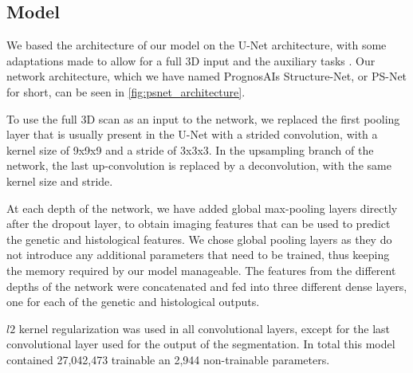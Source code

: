 \subsection{Model}\label{sec:model}

We based the architecture of our model on the U-Net architecture, with some adaptations made to allow for a full 3D input and the auxiliary tasks \autocite{ronneberger2015unet}.
Our network architecture, which we have named PrognosAIs Structure-Net, or PS-Net for short, can be seen in \cref{fig:psnet_architecture}.

To use the full 3D scan as an input to the network, we replaced the first pooling layer that is usually present in the U-Net with a strided convolution, with a kernel size of 9x9x9 and a stride of 3x3x3.
In the upsampling branch of the network, the last up-convolution is replaced by a deconvolution, with the same kernel size and stride.

At each depth of the network, we have added global max-pooling layers directly after the dropout layer, to obtain imaging features that can be used to predict the genetic and histological features.
We chose global pooling layers as they do not introduce any additional parameters that need to be trained, thus keeping the memory required by our model manageable.
The features from the different depths of the network were concatenated and fed into three different dense layers, one for each of the genetic and histological outputs.

$l2$ kernel regularization was used in all convolutional layers, except for the last convolutional layer used for the output of the segmentation.
In total this model contained 27,042,473 trainable an 2,944 non-trainable parameters.

